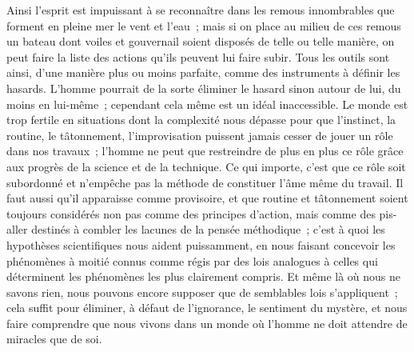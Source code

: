 \documentclass[french,twoside]{book} %
\begin{document}
Ainsi l'esprit est impuissant à se reconnaître dans les remous innombrables que forment en pleine mer le vent et l'eau ; mais si on place au milieu de ces remous un bateau dont voiles et gouvernail soient disposés de telle ou telle manière, on peut faire la liste des actions qu'ils peuvent lui faire subir. Tous les outils sont ainsi, d'une manière plus ou moins parfaite, comme des instruments à définir les hasards. L'homme pourrait de la sorte éliminer le hasard sinon autour de lui, du moins en lui-même ; cependant cela même est un idéal inaccessible. Le monde est trop fertile en situations dont la complexité nous dépasse pour que l'instinct, la routine, le tâtonnement, l'improvisation puissent jamais cesser de jouer un rôle dans nos travaux ; l'homme ne peut que restreindre de plus en plus ce rôle grâce aux progrès de la science et de la technique. Ce qui importe, c'est que ce rôle soit subordonné et n'empêche pas la méthode de constituer l'âme même du travail. Il faut aussi qu'il apparaisse comme provisoire, et que routine et tâtonnement soient toujours considérés non pas comme des principes d'action, mais comme des pis-aller destinés à combler les lacunes de la pensée méthodique ; c'est à quoi les hypothèses scientifiques nous aident puissamment, en nous faisant concevoir les phénomènes à moitié connus comme régis par des lois analogues à celles qui déterminent les phénomènes les plus clairement compris. Et même là où nous ne savons rien, nous pouvons encore supposer que de semblables lois s'appliquent ; cela suffit pour éliminer, à défaut de l'ignorance, le sentiment du mystère, et nous faire comprendre que nous vivons dans un monde où l'homme ne doit attendre de miracles que de soi.\par
\end{document}
